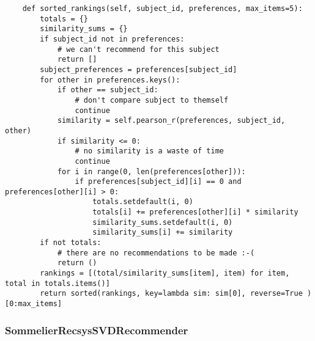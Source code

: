 \begin{verbatim}
    def sorted_rankings(self, subject_id, preferences, max_items=5):
        totals = {}
        similarity_sums = {}
        if subject_id not in preferences:
            # we can't recommend for this subject
            return []
        subject_preferences = preferences[subject_id]
        for other in preferences.keys():
            if other == subject_id:
                # don't compare subject to themself
                continue
            similarity = self.pearson_r(preferences, subject_id, other)
            if similarity <= 0:
                # no similarity is a waste of time
                continue
            for i in range(0, len(preferences[other])):
                if preferences[subject_id][i] == 0 and preferences[other][i] > 0:
                    totals.setdefault(i, 0)
                    totals[i] += preferences[other][i] * similarity
                    similarity_sums.setdefault(i, 0)
                    similarity_sums[i] += similarity
        if not totals:
            # there are no recommendations to be made :-(
            return ()
        rankings = [(total/similarity_sums[item], item) for item, total in totals.items()]
        return sorted(rankings, key=lambda sim: sim[0], reverse=True )[0:max_items]
\end{verbatim}

\subsubsection{SommelierRecsysSVDRecommender}

